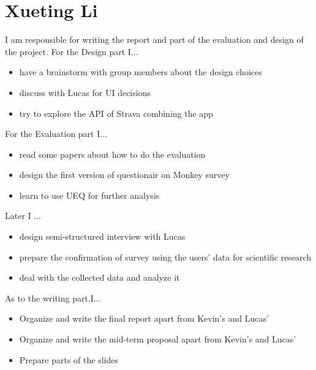 \documentclass{sigchi}
\begin{document}
\section{Xueting Li}
I am responsible for writing the report and part of the  evaluation and design of the project.
For the Design part I...
\begin{itemize}
\item have a brainstorm with group members about the design choices 
\item discuss with Lucas for UI decisions
\item try to explore the API of Strava combining the app
\end{itemize}
For the Evaluation part I...
\begin{itemize}
\item read some papers about how to do the evaluation 
\item design the first version of questionair on Monkey survey
\item learn to use UEQ for further analysis
\end{itemize}

Later I ...
\begin{itemize}
\item design semi-structured interview with Lucas
\item prepare the confirmation of survey using the users' data for scientific research
\item deal with the collected data and analyze it
\end{itemize}

As to the writing part,I...
\begin{itemize}
\item Organize and  write  the final report apart from Kevin's and Lucas'
\item Organize and  write  the mid-term proposal apart from Kevin's and Lucas'
\item Prepare parts of the slides
\end{itemize}
\balance{}
\end{document}

